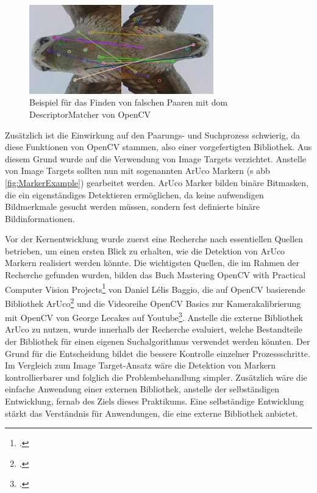 \begin{figure}[H]
\centering
\includegraphics[width=8cm]{Bilder/ZielsetzungUndVorgehensweise/1428488468101951.jpg}
\caption[Beispiel für das Finden von falschen Paaren mit dem DescriptorMatcher von OpenCV]{Beispiel für das Finden von falschen Paaren mit dom DescriptorMatcher von OpenCV\protect\footnotemark}
\label{fig:DescriptorMatcherWrong}
\end{figure}

\noindent Zusätzlich ist die Einwirkung auf den Paarungs- und Suchprozess schwierig, da diese Funktionen von OpenCV stammen, also einer vorgefertigten Bibliothek. Aus diesem Grund wurde auf die Verwendung von Image Targets verzichtet. Anstelle von Image Targets sollten nun mit sogenannten ArUco Markern (\acs{s} \acs{abb} \ref{fig:MarkerExample}) gearbeitet werden. ArUco Marker bilden binäre Bitmasken, die ein eigenständiges Detektieren ermöglichen, da keine aufwendigen Bildmerkmale gesucht werden müssen, sondern fest definierte binäre Bildinformationen.

Vor der Kernentwicklung wurde zuerst eine Recherche nach essentiellen Quellen betrieben, um einen ersten Blick zu erhalten, wie die Detektion von ArUco Markern realisiert werden könnte. Die wichtigsten Quellen, die im Rahmen der Recherche gefunden wurden, bilden das Buch \glqq Mastering OpenCV with Practical Computer Vision Projects\grqq \footcite{Baggioonline} von Daniel Lélis Baggio, die auf OpenCV basierende Bibliothek \glqq ArUco\grqq \footcite{arucoonline} und die Videoreihe \glqq OpenCV Basics\grqq{} zur Kamerakalibrierung mit OpenCV von George Lecakes auf Youtube\footcite{LecakesOpenCV}. Anstelle die externe Bibliothek ArUco zu nutzen, wurde innerhalb der Recherche evaluiert, welche Bestandteile der Bibliothek für einen eigenen Suchalgorithmus verwendet werden könnten. Der Grund für die Entscheidung bildet die bessere Kontrolle einzelner Prozessschritte. Im Vergleich zum Image Target-Ansatz wäre die Detektion von Markern kontrollierbarer und folglich die Problembehandlung simpler. Zusätzlich wäre die einfache Anwendung einer externen Bibliothek, anstelle der selbständigen Entwicklung, fernab des Ziels dieses Praktikums. Eine selbständige Entwicklung stärkt das Verständnis für Anwendungen, die eine externe Bibliothek anbietet.

